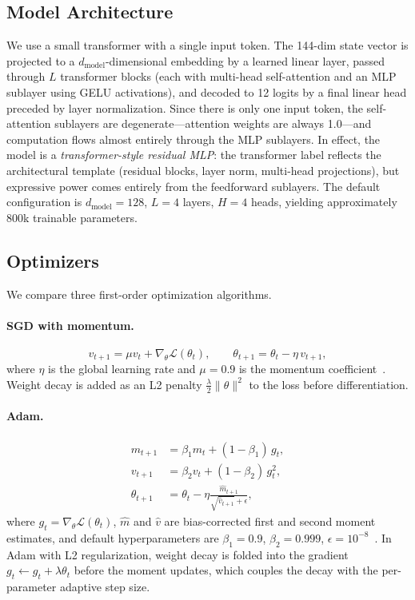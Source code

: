 \documentclass[11pt]{article}
\begin{document}
\subsection{Model Architecture}

We use a small transformer with a single input token. The 144-dim state vector
is projected to a $d_\text{model}$-dimensional embedding by a learned linear
layer, passed through $L$ transformer blocks (each with multi-head self-attention
and an MLP sublayer using GELU activations), and decoded to 12 logits by a
final linear head preceded by layer normalization.
Since there is only one input token, the self-attention sublayers are
degenerate---attention weights are always 1.0---and computation flows almost
entirely through the MLP sublayers. In effect, the model is a
\emph{transformer-style residual MLP}: the transformer label reflects the
architectural template (residual blocks, layer norm, multi-head projections),
but expressive power comes entirely from the feedforward sublayers. The default
configuration is $d_\text{model} = 128$, $L = 4$ layers, $H = 4$ heads,
yielding approximately 800k trainable parameters.

\subsection{Optimizers}

We compare three first-order optimization algorithms.

\paragraph{SGD with momentum.}
\begin{equation}
  v_{t+1} = \mu v_t + \nabla_\theta \mathcal{L}(\theta_t), \qquad
  \theta_{t+1} = \theta_t - \eta\, v_{t+1},
  \label{eq:sgd}
\end{equation}
where $\eta$ is the global learning rate and $\mu = 0.9$ is the momentum
coefficient~\cite{sutskever2013momentum}. Weight decay is added as an L2 penalty
$\tfrac{\lambda}{2}\|\theta\|^2$ to the loss before differentiation.

\paragraph{Adam.}
\begin{align}
  m_{t+1} &= \beta_1 m_t + (1 - \beta_1)\, g_t, \label{eq:adam-m}\\
  v_{t+1} &= \beta_2 v_t + (1 - \beta_2)\, g_t^2, \label{eq:adam-v}\\
  \theta_{t+1} &= \theta_t - \eta \frac{\hat{m}_{t+1}}{\sqrt{\hat{v}_{t+1}} + \epsilon},
  \label{eq:adam-update}
\end{align}
where $g_t = \nabla_\theta \mathcal{L}(\theta_t)$, $\hat{m}$ and $\hat{v}$ are
bias-corrected first and second moment estimates, and default hyperparameters are
$\beta_1 = 0.9$, $\beta_2 = 0.999$, $\epsilon = 10^{-8}$~\cite{kingma2015adam}.
In Adam with L2 regularization, weight decay is folded into the gradient
$g_t \leftarrow g_t + \lambda\theta_t$ before the moment updates, which couples
the decay with the per-parameter adaptive step size.
\end{document}
